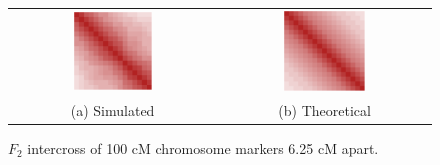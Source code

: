 \documentclass{article}
\begin{document}
\begin{figure}[htp]
  \begin{center}
    \begin{tabular}{cc}
      \includegraphics[width = 0.4\textwidth]{./img/chevSim.png} &
      \includegraphics[width = 0.4\textwidth]{./img/chevSimTheory.png} \\
      {\footnotesize (a) Simulated} &
      {\footnotesize (b) Theoretical} \\
    \end{tabular}
  \end{center}
  \caption{$F_2$ intercross of 100 cM chromosome markers 6.25 cM apart.}
  \label{fig:paperSims}
\end{figure}
\end{document}
